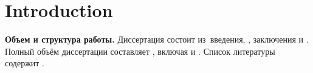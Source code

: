 \chapter*{Introduction}                         %

\newcommand{\actuality}{}
\newcommand{\progress}{}
\newcommand{\aim}{{\textbf\aimTXT}}
\newcommand{\tasks}{\textbf{\tasksTXT}}
\newcommand{\novelty}{\textbf{\noveltyTXT}}
\newcommand{\influence}{\textbf{\influenceTXT}}
\newcommand{\methods}{\textbf{\methodsTXT}}
\newcommand{\defpositions}{\textbf{\defpositionsTXT}}
\newcommand{\reliability}{\textbf{\reliabilityTXT}}
\newcommand{\probation}{\textbf{\probationTXT}}
\newcommand{\contribution}{\textbf{\contributionTXT}}
\newcommand{\publications}{\textbf{\publicationsTXT}}


\textbf{Объем и структура работы.} Диссертация состоит из~введения,
,
заключения и
.
%
Полный объём диссертации составляет
, включая
 и
.
Список литературы содержит
.
